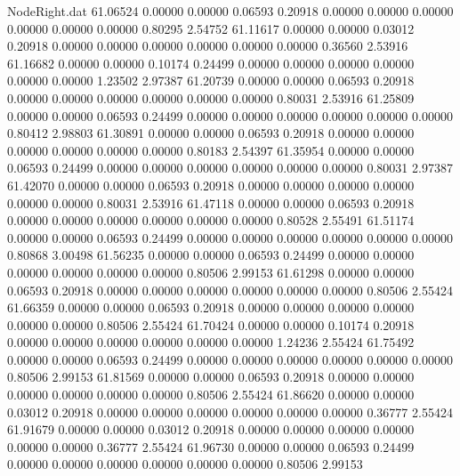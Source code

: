 \begin{filecontents}{NodeRight.dat}
  61.06524    0.00000    0.00000     0.06593    0.20918    0.00000    0.00000    0.00000    0.00000    0.00000    0.00000    0.80295    2.54752
  61.11617    0.00000    0.00000     0.03012    0.20918    0.00000    0.00000    0.00000    0.00000    0.00000    0.00000    0.36560    2.53916
  61.16682    0.00000    0.00000     0.10174    0.24499    0.00000    0.00000    0.00000    0.00000    0.00000    0.00000    1.23502    2.97387
  61.20739    0.00000    0.00000     0.06593    0.20918    0.00000    0.00000    0.00000    0.00000    0.00000    0.00000    0.80031    2.53916
  61.25809    0.00000    0.00000     0.06593    0.24499    0.00000    0.00000    0.00000    0.00000    0.00000    0.00000    0.80412    2.98803
  61.30891    0.00000    0.00000     0.06593    0.20918    0.00000    0.00000    0.00000    0.00000    0.00000    0.00000    0.80183    2.54397
  61.35954    0.00000    0.00000     0.06593    0.24499    0.00000    0.00000    0.00000    0.00000    0.00000    0.00000    0.80031    2.97387
  61.42070    0.00000    0.00000     0.06593    0.20918    0.00000    0.00000    0.00000    0.00000    0.00000    0.00000    0.80031    2.53916
  61.47118    0.00000    0.00000     0.06593    0.20918    0.00000    0.00000    0.00000    0.00000    0.00000    0.00000    0.80528    2.55491
  61.51174    0.00000    0.00000     0.06593    0.24499    0.00000    0.00000    0.00000    0.00000    0.00000    0.00000    0.80868    3.00498
  61.56235    0.00000    0.00000     0.06593    0.24499    0.00000    0.00000    0.00000    0.00000    0.00000    0.00000    0.80506    2.99153
  61.61298    0.00000    0.00000     0.06593    0.20918    0.00000    0.00000    0.00000    0.00000    0.00000    0.00000    0.80506    2.55424
  61.66359    0.00000    0.00000     0.06593    0.20918    0.00000    0.00000    0.00000    0.00000    0.00000    0.00000    0.80506    2.55424
  61.70424    0.00000    0.00000     0.10174    0.20918    0.00000    0.00000    0.00000    0.00000    0.00000    0.00000    1.24236    2.55424
  61.75492    0.00000    0.00000     0.06593    0.24499    0.00000    0.00000    0.00000    0.00000    0.00000    0.00000    0.80506    2.99153
  61.81569    0.00000    0.00000     0.06593    0.20918    0.00000    0.00000    0.00000    0.00000    0.00000    0.00000    0.80506    2.55424
  61.86620    0.00000    0.00000     0.03012    0.20918    0.00000    0.00000    0.00000    0.00000    0.00000    0.00000    0.36777    2.55424
  61.91679    0.00000    0.00000     0.03012    0.20918    0.00000    0.00000    0.00000    0.00000    0.00000    0.00000    0.36777    2.55424
  61.96730    0.00000    0.00000     0.06593    0.24499    0.00000    0.00000    0.00000    0.00000    0.00000    0.00000    0.80506    2.99153

\end{filecontents}
